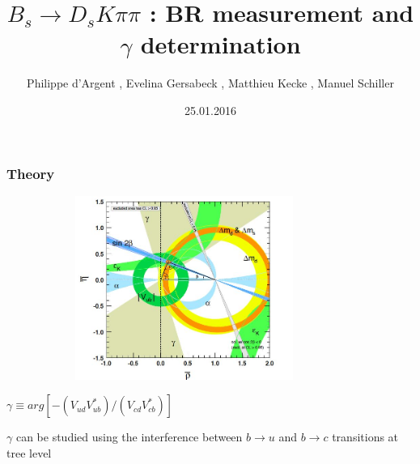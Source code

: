 \documentclass[]{beamer}
\title{$B_{s}\rightarrow D_{s}K\pi\pi$ : BR measurement and $\gamma$ determination}
\author{Philippe d'Argent \inst{1}, Evelina Gersabeck \inst{1}, Matthieu Kecke \inst{1}, Manuel Schiller \inst{2}}
\institute{\inst{1} PI Heidelberg, \inst{2} CERN}
\date{25.01.2016}
\begin{document}
\frame{\titlepage}

\begin{frame}
\frametitle{Theory}

\begin{figure}
\includegraphics[width=9.5cm,height=6.0cm]{pics/CKMvincoli}
\end{figure}

$\gamma \equiv arg[-(V_{ud}V_{ub}^{*})/(V_{cd}V_{cb}^{*})]$ \newline

$\gamma$ can be studied using the interference between $b\rightarrow u$ and $b \rightarrow c$ transitions at tree level

\end{frame}
\end{document}

